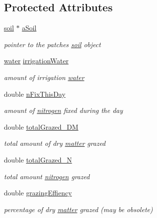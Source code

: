 \subsection*{Protected Attributes}
\begin{DoxyCompactItemize}
\item 
\hyperlink{classsoil}{soil} $\ast$ \hyperlink{classecosystem_a875bd0393f05bb6a71e5194459498038}{aSoil}
\begin{DoxyCompactList}\small\item\em pointer to the patches \hyperlink{classsoil}{soil} object \item\end{DoxyCompactList}\item 
\hyperlink{classwater}{water} \hyperlink{classecosystem_a887cf0ec7ec752882a3ee9d59d814d72}{irrigationWater}
\begin{DoxyCompactList}\small\item\em amount of irrigation \hyperlink{classwater}{water} \item\end{DoxyCompactList}\item 
double \hyperlink{classecosystem_a80b27b606e2c7ce413e10ea7d783469e}{nFixThisDay}
\begin{DoxyCompactList}\small\item\em amount of \hyperlink{classnitrogen}{nitrogen} fixed during the day \item\end{DoxyCompactList}\item 
double \hyperlink{classecosystem_a4aeb89d26c705346cfdb14914d0b0aaa}{totalGrazed\_\-DM}
\begin{DoxyCompactList}\small\item\em total amount of dry \hyperlink{classmatter}{matter} grazed \item\end{DoxyCompactList}\item 
double \hyperlink{classecosystem_a77bd4dfe78513840eb8c15a0206880a5}{totalGrazed\_\-N}
\begin{DoxyCompactList}\small\item\em total amount \hyperlink{classnitrogen}{nitrogen} grazed \item\end{DoxyCompactList}\item 
double \hyperlink{classecosystem_a57fe8b0f42a7b0aa153ff9a628d2fae2}{grazingEffiency}
\begin{DoxyCompactList}\small\item\em percentage of dry \hyperlink{classmatter}{matter} grazed (may be obsolete) \item\end{DoxyCompactList}\item 

\end{DoxyCompactItemize}
